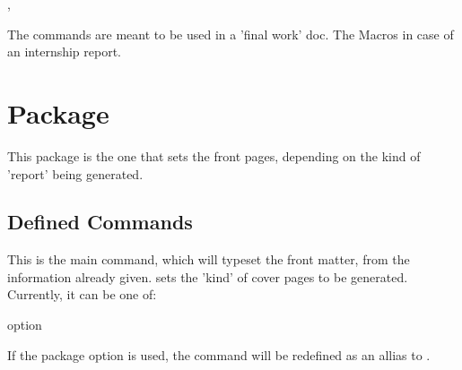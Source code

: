 \documentclass[article,nogeometry,english,tocdepth=3,secdepth=3]{ufrgscca} %
\begin{document}
\begin{codedescribe}{\supervisor,\supervisorinfo}%
\begin{codesyntax}
\end{codesyntax}
\end{codedescribe}

\begin{tsremark}[N.B.:]
The commands \tsobj{\advisor,\coadvisor,\examiner,\altexaminer} are meant to be used in a 'final work' doc. The Macros \tsobj{\internship,\tutor,\supervisor} in case of an internship report.
\end{tsremark}


\section{ Package}
This package is the one that sets the front pages, depending on the kind of 'report' being generated. 


\subsection{Defined Commands}
\begin{codedescribe}[code,new=2023/11/18]{\MakeCoverPages}
	\begin{codesyntax}%
	\end{codesyntax}
This is the main command, which will typeset the front matter, from the information already given.  sets the 'kind' of cover pages to be generated. Currently, it can be one of:
\end{codedescribe}
\begin{describelist}{option}
\end{describelist}
\begin{tsremark}[N.B.:]
 If the package option  is used, the command \tsobj{\maketitle} will be redefined as an allias to \tsobj{\MakeCoverPages}.
\end{tsremark}
\end{document}
